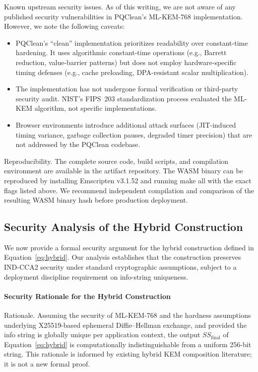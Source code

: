 \documentclass[11pt,a4paper]{article}
\def\textbf#1{#1}%
\def\texttt#1{#1}%
\begin{document}
\textbf{Known upstream security issues.} As of this writing, we are not aware of any published security vulnerabilities in PQClean's ML-KEM-768 implementation. However, we note the following caveats:
\begin{itemize}
    \item PQClean's ``clean'' implementation prioritizes readability over constant-time hardening. It uses algorithmic constant-time operations (e.g., Barrett reduction, value-barrier patterns) but does not employ hardware-specific timing defenses (e.g., cache preloading, DPA-resistant scalar multiplication).
    \item The implementation has not undergone formal verification or third-party security audit. NIST's FIPS~203 standardization process evaluated the ML-KEM algorithm, not specific implementations.
    \item Browser environments introduce additional attack surfaces (JIT-induced timing variance, garbage collection pauses, degraded timer precision) that are not addressed by the PQClean codebase.
\end{itemize}

\textbf{Reproducibility.} The complete source code, build scripts, and compilation environment are available in the artifact repository. The WASM binary can be reproduced by installing Emscripten v3.1.52 and running \texttt{make all} with the exact flags listed above. We recommend independent compilation and comparison of the resulting WASM binary hash before production deployment.

\subsection{Security Analysis of the Hybrid Construction}
\label{subsec:hybrid-security}

We now provide a formal security argument for the hybrid construction defined in Equation~\ref{eq:hybrid}. Our analysis establishes that the construction preserves IND-CCA2 security under standard cryptographic assumptions, subject to a deployment discipline requirement on info-string uniqueness.

\paragraph{Security Rationale for the Hybrid Construction}
\label{thm:hybrid-security}
\textbf{Rationale.} Assuming the security of ML-KEM-768 and the hardness assumptions underlying X25519-based ephemeral Diffie--Hellman exchange, and provided the info string is globally unique per application context, the output $SS_{\text{final}}$ of Equation~\ref{eq:hybrid} is computationally indistinguishable from a uniform 256-bit string. This rationale is informed by existing hybrid KEM composition literature; it is not a new formal proof.
\end{document}

